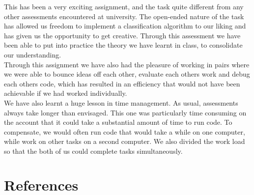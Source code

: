 \documentclass[11pt, oneside]{article}   	%
\begin{document}
\indent This has been a very exciting assignment, and the task quite different from any other assessments encountered at university. The open-ended nature of the task has allowed us freedom to implement a classification algorithm to our liking and has given us the opportunity to get creative. Through this assessment we have been able to put into practice the theory we have learnt in class, to consolidate our understanding.
\\ \indent Through this assignment we have also had the pleasure of working in pairs where we were able to bounce ideas off each other, evaluate each others work and debug each others code, which has resulted in an efficiency that would not have been achievable if we had worked individually. 
\\ \indent We have also learnt a huge lesson in time management. As usual, assessments always take longer than envisaged. This one was particularly time consuming on the account that it could take a substantial amount of time to run code. To compensate, we would often run code that would take a while on one computer, while work on other tasks on a second computer. We also divided the work load so that the both of us could complete tasks simultaneously.

\section*{References}
\end{document}
